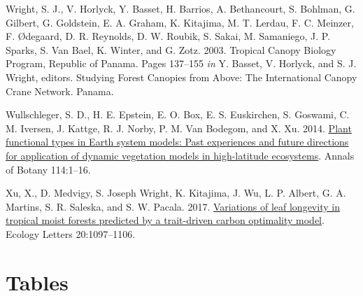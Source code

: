 \documentclass[
  12pt,
]{article}
\newlength{\cslhangindent}
\newlength{\cslentryspacingunit} %
\newenvironment{CSLReferences}[2] %
 {%
  \setlength{\parindent}{0pt}
  \ifodd #1
  \let\oldpar\par
  \def\par{\hangindent=\cslhangindent\oldpar}
  \fi
  \setlength{\parskip}{#2\cslentryspacingunit}
 }%
 {}
\begin{document}
\begin{CSLReferences}{1}{0}
\leavevmode{}%
Wright, S. J., V. Horlyck, Y. Basset, H. Barrios, A. Bethancourt, S. Bohlman, G. Gilbert, G. Goldstein, E. A. Graham, K. Kitajima, M. T. Lerdau, F. C. Meinzer, F. Ødegaard, D. R. Reynolds, D. W. Roubik, S. Sakai, M. Samaniego, J. P. Sparks, S. Van Bael, K. Winter, and G. Zotz. 2003. Tropical {Canopy Biology Program}, {Republic} of {Panama}. Pages 137--155 \emph{in} Y. Basset, V. Horlyck, and S. J. Wright, editors. Studying {Forest Canopies} from {Above}: The {International Canopy Crane Network}. {Panama}.

\leavevmode{}%
Wullschleger, S. D., H. E. Epstein, E. O. Box, E. S. Euskirchen, S. Goswami, C. M. Iversen, J. Kattge, R. J. Norby, P. M. Van Bodegom, and X. Xu. 2014. \href{https://doi.org/10.1093/aob/mcu077}{Plant functional types in {Earth} system models: Past experiences and future directions for application of dynamic vegetation models in high-latitude ecosystems}. Annals of Botany 114:1--16.

\leavevmode{}%
Xu, X., D. Medvigy, S. Joseph Wright, K. Kitajima, J. Wu, L. P. Albert, G. A. Martins, S. R. Saleska, and S. W. Pacala. 2017. \href{https://doi.org/10.1111/ele.12804}{Variations of leaf longevity in tropical moist forests predicted by a trait-driven carbon optimality model}. Ecology Letters 20:1097--1106.

\end{CSLReferences}

\newpage

\hypertarget{tables}{%
\section{Tables}\label{tables}}
\end{document}
